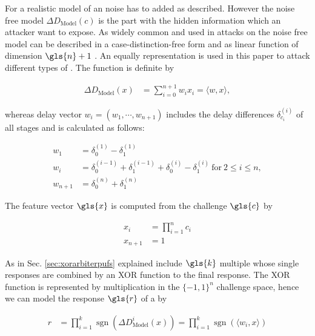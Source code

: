 For a realistic model of an \apuf noise has to added as described. 
However the noise free model $\Delta D_{\mathrm{Model}}(c)$ is the part with the hidden information which an attacker want to expose.
As widely common and used in attacks on \apuf the noise free model can be described in a case-distinction-free form and as linear function of dimension $\gls{n} + 1$ \cite{Majzoobi2008TestingSecurity, Majzoobi2008LightweightPUFs, Ruhrmair2010ModelingFunctions, Becker2015ThePUFs}.
An equally representation is used in this paper to attack different types of \apufs.
The function is definite by

\begin{align}
\Delta D_{\mathrm{Model}}(x) &= \sum_{i=0}^{n+1} w_i x_i = \langle w,x\rangle, \label{equ:pufmodelw}
\end{align}

whereas delay vector $w_i = (w_1, \cdots, w_{n+1})$ includes the delay differences $\delta_{c_i}^{(i)}$ of all stages and is calculated as follows:

\begin{align*}
w_1 &= \delta_{0}^{(1)} - \delta_{1}^{(1)}\\
w_i &= \delta_{0}^{(i-1)} + \delta_{1}^{(i-1)} + \delta_{0}^{(i)} - \delta_{1}^{(i)}\ \text{for}\ 2 \le i \le n,\\
w_{n+1} &= \delta_{0}^{(n)} + \delta_{1}^{(n)}
\end{align*}
 
The feature vector $\gls{x}$ is computed from the challenge $\gls{c}$ by

\begin{align*}
x_i &= \prod_{i=1}^n c_i\\
x_{n+1} &= 1
\end{align*}

As in Sec. \ref{sec:xorarbiterpufs} explained \xpufs include $\gls{k}$ multiple \apufs whose single responses are combined by an \ac{XOR} function to the final response.
The \ac{XOR} function is represented by multiplication in the $\{-1,1\}^n$ challenge space, hence we can model the response $\gls{r}$ of a \xpuf by

\begin{align*}
r &= \prod_{i=1}^k \operatorname{sgn}(\Delta D_{\mathrm{Model}}^i(x)) = \prod_{i=1}^k \operatorname{sgn}(\langle w_i,x\rangle)
\end{align*}

